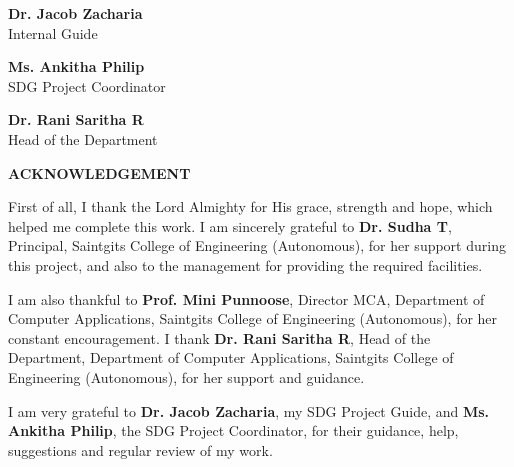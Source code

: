 \documentclass[12pt,a4paper]{report}
\begin{document}
\vspace{2.2cm}

\noindent
\begin{minipage}[t]{0.45\textwidth}
\raggedright
\textbf{Dr. Jacob Zacharia}\\
Internal Guide
\end{minipage}
\hfill
\begin{minipage}[t]{0.45\textwidth}
\raggedleft
\textbf{Ms. Ankitha Philip}\\
SDG Project Coordinator
\end{minipage}

\vspace{2.2cm}

\noindent
\begin{center}
\begin{minipage}{0.55\textwidth}
\centering
\textbf{Dr. Rani Saritha R}\\
Head of the Department\\
\end{minipage}
\end{center}

\vspace{1.5cm}


\newpage
\thispagestyle{empty}

\begin{center}
\fontsize{16pt}{18pt}\selectfont
\textbf{ACKNOWLEDGEMENT}
\end{center}

\vspace{1cm}

First of all, I thank the Lord Almighty for His grace, strength and hope, which helped me complete this work. I am sincerely grateful to \textbf{Dr. Sudha T}, Principal, Saintgits College of Engineering (Autonomous), for her support during this project, and also to the management for providing the required facilities.

I am also thankful to \textbf{Prof. Mini Punnoose}, Director MCA, Department of Computer Applications, Saintgits College of Engineering (Autonomous), for her constant encouragement. I thank \textbf{Dr. Rani Saritha R}, Head of the Department, Department of Computer Applications, Saintgits College of Engineering (Autonomous), for her support and guidance.

I am very grateful to \textbf{Dr. Jacob Zacharia}, my SDG Project Guide, and \textbf{Ms. Ankitha Philip}, the SDG Project Coordinator, for their guidance, help, suggestions and regular review of my work.
\end{document}

